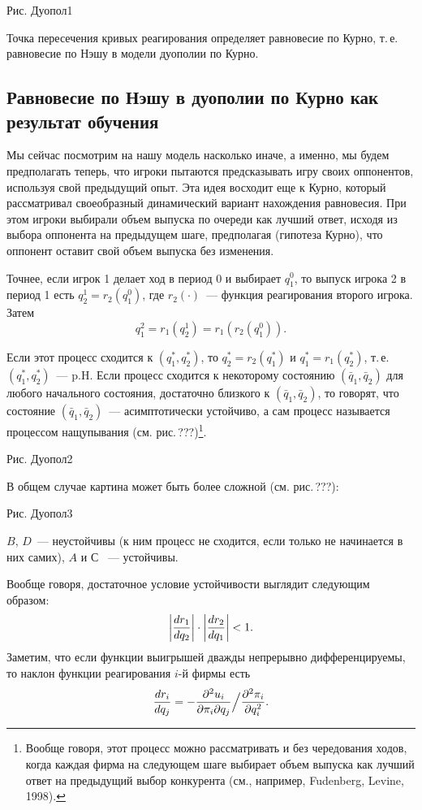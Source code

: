{Рис. Дуопол1


Точка пересечения кривых реагирования определяет равновесие по
Курно, т.\,е.  равновесие по Нэшу в модели дуополии по Курно.

\subsection{Равновесие по Нэшу в дуополии по Курно как результат обучения}

Мы сейчас посмотрим на нашу модель насколько иначе, а именно, мы
будем предполагать теперь, что игроки пытаются предсказывать игру
своих оппонентов, используя свой предыдущий опыт. Эта идея восходит
еще к Курно, который рассматривал своеобразный динамический вариант
нахождения равновесия. При этом игроки выбирали объем выпуска по
очереди как лучший ответ,  исходя из выбора оппонента на предыдущем
шаге, предполагая (гипотеза Курно), что  оппонент оставит свой объем
выпуска без изменения.

Точнее, если игрок 1 делает ход в период $0$ и выбирает $q^0_1$, то
выпуск игрока 2 в период 1 есть $q^1_2=r_2(q^0_1)$, где
$r_2(\cdot)$~--- функция реагирования второго игрока. Затем
$$
q^2_1=r_1(q^1_2)=r_1(r_2(q^0_1)).
$$

Если этот процесс сходится к $(q^*_1,q^*_2)$, то $q^*_2=r_2(q^*_1)$
и $q^*_1=r_1(q^*_2)$, т.\,е. $(q^*_1,q^*_2)$~--- p.H. Если процесс
сходится к некоторому состоянию $(\bar q_1,\bar q_2)$ для любого
начального состояния, достаточно близкого к $(\bar q_1,\bar q_2)$,
то говорят, что
состояние $(\bar q_1,\bar q_2)$~--- асимптотически устойчиво, а сам
процесс называется процессом нащупывания (см. рис.\,???)\footnote{
Вообще говоря, этот процесс можно рассматривать и без чередования
ходов, когда каждая фирма на следующем шаге выбирает объем выпуска
как лучший ответ на предыдущий выбор конкурента (см., например,
Fudenberg, Levine, 1998).}.


Рис. Дуопол2


В общем случае картина может быть более сложной (см. рис.\,???):

Рис. Дуопол3

$B$, $D$~--- неустойчивы  (к ним процесс не сходится, если
только не начинается   в них самих), $A$ и $С$ ~--- устойчивы.

Вообще говоря, достаточное условие устойчивости выглядит следующим
образом:
$$
\biggl |{dr_1\over dq_2}\biggr |\cdot\biggl |{dr_2\over dq_1}\biggr
|<1.
$$
Заметим, что если функции выигрышей дважды непрерывно
дифференцируемы, то наклон функции реагирования $i$-й фирмы есть
$$
{dr_i\over dq_j}=-{\partial^2 u_i\over{\partial\pi_i\partial
q_j}}\Big /{{\partial^2\pi_i}\over{\partial q^2_i}}.
$$

}
